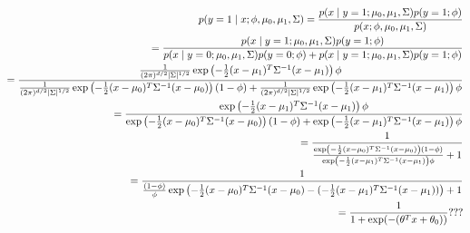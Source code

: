 \begin{answer}
\begin{eqnarray*}
p(y = 1\mid x; \phi, \mu_0, \mu_1, \Sigma)
=\frac{p(x \mid y = 1;\mu_0, \mu_1, \Sigma)p(y=1;\phi)}{p(x;\phi, \mu_0, \mu_1, \Sigma)}\\
=\frac{p(x \mid y = 1;\mu_0, \mu_1, \Sigma)p(y=1;\phi)}{p(x \mid y = 0;\mu_0, \mu_1, \Sigma)p(y=0;\phi)+p(x \mid y = 1;\mu_0, \mu_1, \Sigma)p(y=1;\phi)}\\
=\frac{\frac{1}{(2\pi)^{{d}/2} |\Sigma|^{1/2}}\exp\left(-\frac{1}{2}(x-\mu_1)^T \Sigma^{-1} (x-\mu_1) \right)\phi}{\frac{1}{(2\pi)^{{d}/2} |\Sigma|^{1/2}}\exp\left(-\frac{1}{2}(x-\mu_{0})^T \Sigma^{-1} (x-\mu_{0})\right)(1-\phi)+\frac{1}{(2\pi)^{{d}/2} |\Sigma|^{1/2}}\exp\left(-\frac{1}{2}(x-\mu_1)^T \Sigma^{-1} (x-\mu_1) \right)\phi}\\
=\frac{\exp\left(-\frac{1}{2}(x-\mu_1)^T \Sigma^{-1} (x-\mu_1) \right)\phi}{\exp\left(-\frac{1}{2}(x-\mu_{0})^T \Sigma^{-1} (x-\mu_{0})\right)(1-\phi)+\exp\left(-\frac{1}{2}(x-\mu_1)^T \Sigma^{-1} (x-\mu_1) \right)\phi}\\
=\frac{1}{\frac{\exp\left(-\frac{1}{2}(x-\mu_{0})^T \Sigma^{-1} (x-\mu_{0})\right)(1-\phi)}{\exp\left(-\frac{1}{2}(x-\mu_1)^T \Sigma^{-1} (x-\mu_1) \right)\phi}+1}\\
=\frac{1}{\frac{(1-\phi)}{\phi}\exp\left(-\frac{1}{2}(x-\mu_{0})^T \Sigma^{-1} (x-\mu_{0})-(-\frac{1}{2}(x-\mu_1)^T \Sigma^{-1} (x-\mu_1))\right)+1}\\
= \frac{1}{1 + \exp(-(\theta^T x + \theta_0))}???
\end{eqnarray*}
\end{answer}

